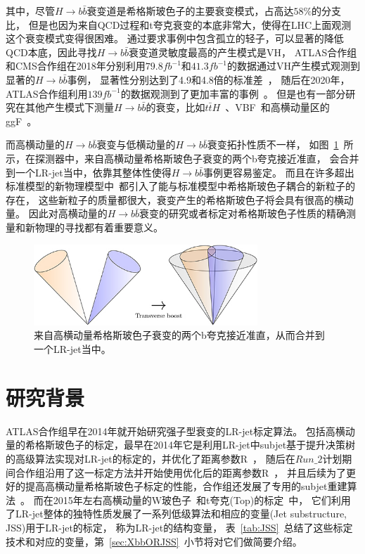 其中，尽管$H\rightarrow b\bar{b}$衰变道是希格斯玻色子的主要衰变模式，占高达$58\%$的分支比，
但是也因为来自QCD过程和t夸克衰变的本底非常大，使得在LHC上面观测这个衰变模式变得很困难。
通过要求事例中包含孤立的轻子，可以显著的降低QCD本底，因此寻找$H\rightarrow b\bar{b}$衰变道灵敏度最高的产生模式是VH，
ATLAS合作组和CMS合作组在2018年分别利用$79.8fb^{-1}$和$41.3fb^{-1}$的数据通过VH产生模式观测到显著的$H\rightarrow b\bar{b}$事例，
显著性分别达到了4.9和4.8倍的标准差~\cite{AHbb8,CHbb3}，
随后在2020年，ATLAS合作组利用$139fb^{-1}$的数据观测到了更加丰富的事例~\cite{AHbb5}。
但是也有一部分研究在其他产生模式下测量$H\rightarrow b\bar{b}$的衰变，比如$t\bar{t}H$~\cite{AHbb7,AHbb8,CHbb1}、VBF~\cite{AHbb6}和高横动量区的ggF~\cite{CHbb3}。

而高横动量的$H\rightarrow b\bar{b}$衰变与低横动量的$H\rightarrow b\bar{b}$衰变拓扑性质不一样，
如图~\ref{fig:Boosted}~所示，在探测器中，来自高横动量希格斯玻色子衰变的两个b夸克接近准直，
会合并到一个LR-jet当中，依靠其整体性使得$H\rightarrow b\bar{b}$事例更容易鉴定。
而且在许多超出标准模型的新物理模型中~\cite{BSMHIGGS1,BSMHIGGS2,BSMHIGGS3}都引入了能与标准模型中希格斯玻色子耦合的新粒子的存在，
这些新粒子的质量都很大，衰变产生的希格斯玻色子将会具有很高的横动量。
因此对高横动量的$H\rightarrow b\bar{b}$衰变的研究或者标定对希格斯玻色子性质的精确测量和新物理的寻找都有着重要意义。

\begin{figure}
  \begin{center}
    \includegraphics[width=0.75\textwidth]{figuresXbb/Boosted.jpg}
  \end{center}
  \caption{
来自高横动量希格斯玻色子衰变的两个b夸克接近准直，从而合并到一个LR-jet当中。
  }
    \label{fig:Boosted}
\end{figure}



\section{研究背景}
\label{sec:XbbBKG}


ATLAS合作组早在2014年就开始研究强子型衰变的LR-jet标定算法。
包括高横动量的希格斯玻色子的标定，最早在2014年它是利用LR-jet中subjet基于提升决策树的高级算法实现对LR-jet的标定的，并优化了距离参数R~\cite{TAGGING1}，
随后在$Run\_2$计划期间合作组沿用了这一标定方法并开始使用优化后的距离参数R~\cite{TAGGING5}，
并且后续为了更好的提高高横动量希格斯玻色子标定的性能，合作组还发展了专用的subjet重建算法~\cite{ATL-PHYS-PUB-2017-010}。
而在2015年左右高横动量的W玻色子~\cite{TAGGING3}和t夸克(Top)的标定~\cite{TAGGING2}中，
它们利用了LR-jet整体的独特性质发展了一系列低级算法和相应的变量(Jet substructure, JSS)用于LR-jet的标定，
称为LR-jet的结构变量，
表~\ref{tab:JSS}~总结了这些标定技术和对应的变量，第~\ref{sec:XbbORJSS}~小节将对它们做简要介绍。

